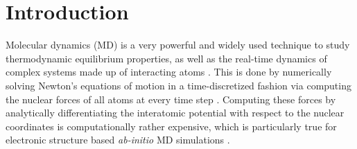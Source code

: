 \documentclass[format=acmsmall,review,timestamp,urlbreakonhyphens]{acmart}
\begin{document}
\author{Thomas D. K\"uhne}





\maketitle


\section{Introduction}

Molecular dynamics (MD) is a very powerful and widely used technique to study thermodynamic equilibrium properties, as well as the real-time dynamics of complex systems made up of interacting atoms \cite{AlderWainwright1957}. This is done by numerically solving Newton's equations of motion in a time-discretized fashion via computing the nuclear forces of all atoms at every time step \cite{RahmanMD}. Computing these forces by analytically differentiating the interatomic potential with respect to the nuclear coordinates is computationally rather expensive, which is particularly true for electronic structure based \textit{ab-initio} MD simulations \cite{CPMD, CPMD_TDK, PayneRMP, WIRES_TDK}.
\end{document}
